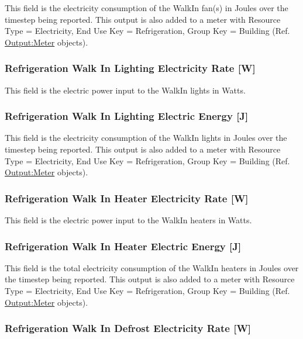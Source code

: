 This field is the electricity consumption of the WalkIn fan(s) in Joules over the timestep being reported. This output is also added to a meter with Resource Type = Electricity, End Use Key = Refrigeration, Group Key = Building (Ref. \hyperref[outputmeter-and-outputmetermeterfileonly]{Output:Meter} objects).

\subsubsection{Refrigeration Walk In Lighting Electricity Rate {[}W{]}}\label{refrigeration-walk-in-lighting-electric-power-w}

This field is the electric power input to the WalkIn lights in Watts.

\subsubsection{Refrigeration Walk In Lighting Electric Energy {[}J{]}}\label{refrigeration-walk-in-lighting-electric-energy-j}

This field is the electricity consumption of the WalkIn lights in Joules over the timestep being reported. This output is also added to a meter with Resource Type = Electricity, End Use Key = Refrigeration, Group Key = Building (Ref. \hyperref[outputmeter-and-outputmetermeterfileonly]{Output:Meter} objects).

\subsubsection{Refrigeration Walk In Heater Electricity Rate {[}W{]}}\label{refrigeration-walk-in-heater-electric-power-w}

This field is the electric power input to the WalkIn heaters in Watts.

\subsubsection{Refrigeration Walk In Heater Electric Energy {[}J{]}}\label{refrigeration-walk-in-heater-electric-energy-j}

This field is the total electricity consumption of the WalkIn heaters in Joules over the timestep being reported. This output is also added to a meter with Resource Type = Electricity, End Use Key = Refrigeration, Group Key = Building (Ref. \hyperref[outputmeter-and-outputmetermeterfileonly]{Output:Meter} objects).

\subsubsection{Refrigeration Walk In Defrost Electricity Rate {[}W{]}}\label{refrigeration-walk-in-defrost-electric-power-w}

